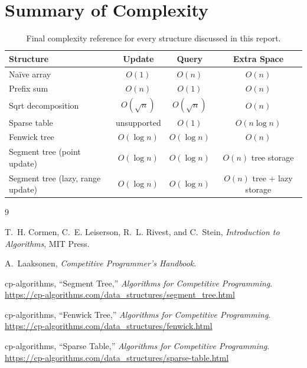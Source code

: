 \documentclass[
  11pt,
  a4paper,
  twoside=false,
  numbers=noenddot,
  headings=big,
  parskip=half,
  toc=bibliography,
  toc=listof,
  bibliography=totoc
]{scrreprt}
\newcommand{\Oh}[1]{O\!\left(#1\right)}
\newcommand{\tblhead}[1]{\textbf{\sffamily #1}}
\begin{document}
\chapter{Summary of Complexity}

\begin{table}[H]
\centering
\caption{Final complexity reference for every structure discussed in this report.}
\label{tab:final-complexity}
\begin{tabular}{lccc}
\toprule
\tblhead{Structure} & \tblhead{Update} & \tblhead{Query} & \tblhead{Extra Space} \\
\midrule
Na\"ive array       & $\Oh{1}$       & $\Oh{n}$       & $\Oh{n}$ \\
Prefix sum          & $\Oh{n}$       & $\Oh{1}$       & $\Oh{n}$ \\
Sqrt decomposition   & $\Oh{\sqrt n}$ & $\Oh{\sqrt n}$ & $\Oh{n}$ \\
Sparse table         & unsupported    & $\Oh{1}$       & $\Oh{n\log n}$ \\
Fenwick tree          & $\Oh{\log n}$  & $\Oh{\log n}$  & $\Oh{n}$ \\
\rowcolor{lightblue!30}
Segment tree (point update) & $\Oh{\log n}$ & $\Oh{\log n}$ & $\Oh{n}$ tree storage \\
\rowcolor{lightblue!30}
Segment tree (lazy, range update) & $\Oh{\log n}$ & $\Oh{\log n}$ & $\Oh{n}$ tree $+$ lazy storage \\
\bottomrule
\end{tabular}
\end{table}

\begin{thebibliography}{9}

T.~H. Cormen, C.~E. Leiserson, R.~L. Rivest, and C.~Stein, \textit{Introduction to Algorithms}, MIT Press.

A.~Laaksonen, \textit{Competitive Programmer's Handbook}.

cp-algorithms, ``Segment Tree,'' \textit{Algorithms for Competitive Programming}. \url{https://cp-algorithms.com/data_structures/segment_tree.html}

cp-algorithms, ``Fenwick Tree,'' \textit{Algorithms for Competitive Programming}. \url{https://cp-algorithms.com/data_structures/fenwick.html}

cp-algorithms, ``Sparse Table,'' \textit{Algorithms for Competitive Programming}. \url{https://cp-algorithms.com/data_structures/sparse-table.html}

\end{thebibliography}
\end{document}
